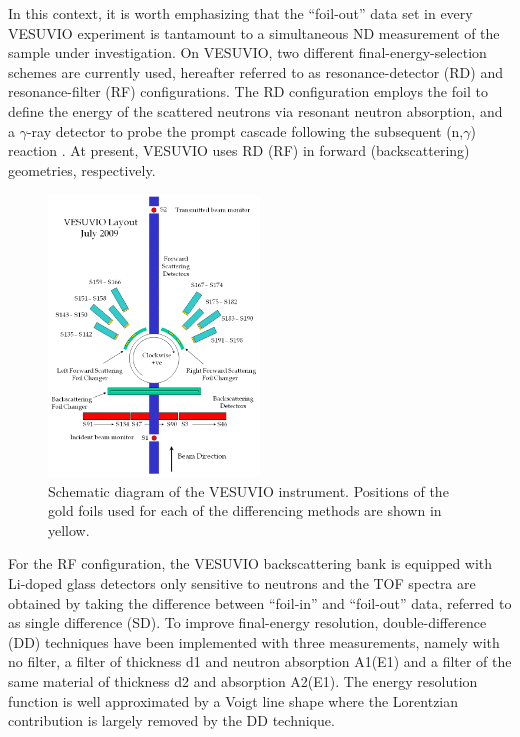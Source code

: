 \documentclass[paper=a4, fontsize=11pt]{scrartcl}	%
\numberwithin{equation}{section}															%
\numberwithin{figure}{section}																%
\numberwithin{table}{section}
\begin{document}
In this context, it is worth emphasizing that the “foil-out” data set in every VESUVIO experiment is tantamount to a simultaneous ND measurement of the sample under investigation. On VESUVIO, two different final-energy-selection schemes are currently used, hereafter referred to as resonance-detector (RD) and resonance-filter (RF) configurations. The RD configuration employs the foil to define the energy of the scattered neutrons via resonant neutron absorption, and a $\gamma$-ray detector to probe the prompt cascade following the subsequent (n,$\gamma$) reaction \cite{schooneveld2006foil}. At present, VESUVIO uses RD (RF) in forward (backscattering) geometries, respectively.

\begin{figure}[H]
\centering
\includegraphics[width=0.5\textwidth]{img/vesuvio-diagram.png}
\caption{Schematic diagram of the VESUVIO instrument. Positions of the gold foils used for each of the differencing methods are shown in yellow.}
\label{fig:VESUVIO-diagram}
\end{figure}

For the RF configuration, the VESUVIO backscattering bank is equipped with Li-doped glass detectors only sensitive to neutrons \cite{seeger1985double} and the TOF spectra are obtained by taking the difference between “foil-in” and “foil-out” data, referred to as single difference (SD). To improve final-energy resolution, double-difference (DD) techniques have been implemented with three measurements, namely with no filter, a filter of thickness d1 and neutron absorption A1(E1) and a filter of the same material of thickness d2 and absorption A2(E1). The energy resolution function is well approximated by a Voigt line shape where the Lorentzian contribution is largely removed by the DD technique.
\end{document}
